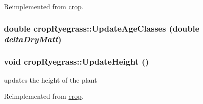 Reimplemented from \hyperlink{classcrop_a9ed02462e332fffb65498075e7499bf4}{crop}.\hypertarget{classcrop_ryegrass_a0e2ec4857ca4630c5a9df02e8cd72b72}{
\subsubsection[{UpdateAgeClasses}]{\setlength{\rightskip}{0pt plus 5cm}double cropRyegrass::UpdateAgeClasses (double {\em deltaDryMatt})}}
\label{classcrop_ryegrass_a0e2ec4857ca4630c5a9df02e8cd72b72}
\hypertarget{classcrop_ryegrass_a73b6ee5b772c6748d37be7d006a092c6}{
\subsubsection[{UpdateHeight}]{\setlength{\rightskip}{0pt plus 5cm}void cropRyegrass::UpdateHeight ()}}
\label{classcrop_ryegrass_a73b6ee5b772c6748d37be7d006a092c6}
updates the height of the plant 

Reimplemented from \hyperlink{classcrop_aeccf3077c6ad647769145b8064ba426b}{crop}.

